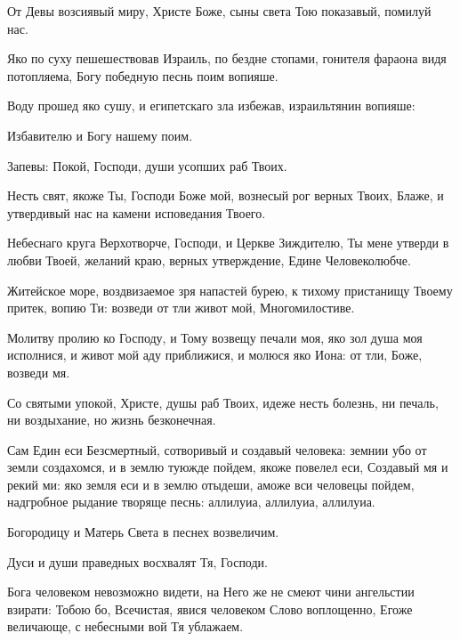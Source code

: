 \begin{mymulticols}
\slavainynen

От Девы возсиявый миру, Христе Боже, сыны света Тою показавый, помилуй нас.


 Яко по суху пешешествовав Израиль, по бездне стопами, гонителя фараона видя потопляема, Богу победную песнь поим вопияше. 

 Воду прошед яко сушу, и египетскаго зла избежав, израильтянин вопияше: 

Избавителю и Богу нашему поим. 

Запевы: Покой, Господи, души усопших раб Твоих. 

\slava 

\inyne

 Несть свят, якоже Ты, Господи Боже мой, вознесый рог верных Твоих, Блаже, и утвердивый нас на камени исповедания Твоего. 

 Небеснаго круга Верхотворче, Господи, и Церкве Зиждителю, Ты мене утверди в любви Твоей, желаний краю, верных утверждение, Едине Человеколюбче. 

 Житейское море, воздвизаемое зря напастей бурею, к тихому пристанищу Твоему притек, вопию Ти: возведи от тли живот мой, Многомилостиве. 

 Молитву пролию ко Господу, и Тому возвещу печали моя, яко зол душа моя исполнися, и живот мой аду приближися, и молюся яко Иона: от тли, Боже, возведи мя. 

 Со святыми упокой, Христе, душы раб Твоих, идеже несть болезнь, ни печаль, ни воздыхание, но жизнь безконечная. 

 Сам Един еси Безсмертный, сотворивый и создавый человека: земнии убо от земли создахомся, и в землю туюжде пойдем, якоже повелел еси, Создавый мя и рекий ми: яко земля еси и в землю отыдеши, аможе вси человецы пойдем, надгробное рыдание творяще песнь: аллилуиа, аллилуиа, аллилуиа. 

 Богородицу и Матерь Света в песнех возвеличим. 

 Дуси и души праведных восхвалят Тя, Господи. 

 Бога человеком невозможно видети, на Него же не смеют чини ангельстии взирати: Тобою бо, Всечистая, явися человеком Слово воплощенно, Егоже величающе, с небесными вой Тя ублажаем. 


\end{mymulticols}
